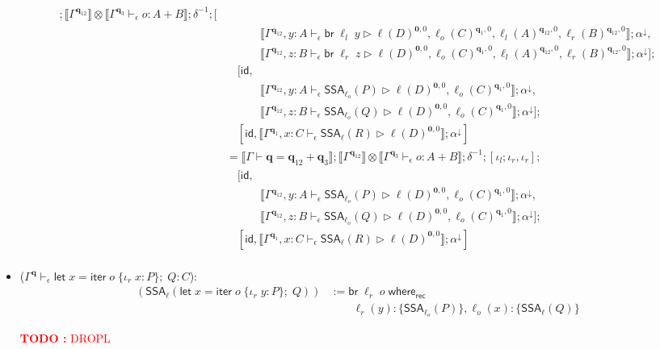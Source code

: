 \documentclass[acmsmall,screen,review]{acmart}
\newcounter{todos}
\newcommand{\TODO}[1]{{
  \stepcounter{todos}
  \begin{center}\large{\textcolor{red}{\textbf{TODO \arabic{todos}:} #1}}\end{center}
}}
\newcommand{\mb}[1]{\ensuremath{\mathbf{#1}}}
\newcommand{\ms}[1]{\ensuremath{\mathsf{#1}}}
\newcommand{\lto}{:}
\newcommand{\linr}[1]{\iota_r\;{#1}}
\newcommand{\letexpr}[3]{\ensuremath{\ms{let}\;#1 = #2;\;#3}}
\newcommand{\brb}[2]{\ms{br}\;#1\;#2}
\newcommand{\cwhere}[2]{#1\;\ms{where}_{\ms{rec}}\;#2}
\newcommand{\wbranch}[3]{#1(#2) \lto \{#3\}}
\newcommand{\liter}[3]{\ms{iter}\;#1\;\{ \linr{#2} \lto #3 \}}
\newcommand{\qsp}[4]{#1 \vdash #2 = #3 + #4}
\newcommand{\hasty}[4]{#1 \vdash_{#2} #3: {#4}}
\newcommand{\haslb}[4]{#1 \vdash_{#2} #3 \rhd #4}
\newcommand{\tossa}[2]{\ms{SSA}_{#1}(#2)}
\newcommand{\dnt}[1]{\llbracket{#1}\rrbracket}
\begin{document}
\begin{itemize}
\begin{align*}
      ; \dnt{\Gamma^{\mb{q}_{12}}} \otimes \dnt{\hasty{\Gamma^{\mb{q}_3}}{\epsilon}{o}{A + B}}
      ; \delta^{-1} ; [
      \\ & \quad \qquad
        \dnt{\haslb{\Gamma^{\mb{q}_{12}}, y : A}{\epsilon}{\brb{\ell_l}{y}}
          {\ell(D)^{\mb{0}, 0}, 
            \ell_o(C)^{\mb{q}_1, 0}, \ell_l(A)^{\mb{q}_{12}, 0}}, \ell_r(B)^{\mb{q}_{12}, 0}} 
          ; \alpha^\downarrow,
      \\ & \quad \qquad
        \dnt{\haslb{\Gamma^{\mb{q}_{12}}, z : B}{\epsilon}{\brb{\ell_r}{z}}
          {\ell(D)^{\mb{0}, 0}, 
            \ell_o(C)^{\mb{q}_1, 0}, \ell_l(A)^{\mb{q}_{12}, 0}}, \ell_r(B)^{\mb{q}_{12}, 0}} 
          ; \alpha^\downarrow
      ]
      ; \\ & \quad
      [
        \ms{id}, \\ & \quad \qquad
        \dnt{
          \haslb{\Gamma^{\mb{q}_{12}}, y : A}{\epsilon}{\tossa{\ell_o}{P}}
                {\ell(D)^{\mb{0}, 0}, \ell_o(C)^{\mb{q}_1, 0}}
        } ; \alpha^\downarrow, \\ & \quad \qquad
        \dnt{
          \haslb{\Gamma^{\mb{q}_{12}}, z : B}{\epsilon}{\tossa{\ell_o}{Q}}
                {\ell(D)^{\mb{0}, 0}, \ell_o(C)^{\mb{q}_1, 0}} 
        } ; \alpha^\downarrow
      ] 
      ; \\ & \quad
      [
        \ms{id}, 
        \dnt{\haslb{\Gamma^{\mb{q}_{1}}, x : C}{\epsilon}{\tossa{\ell}{R}}
              {\ell(D)^{\mb{0}, 0}}} ; \alpha^\downarrow
      ] \\
      & = \dnt{\qsp{\Gamma}{\mb{q}}{\mb{q}_{12}}{\mb{q}_3}} 
        ; \dnt{\Gamma^{\mb{q}_{12}}} \otimes \dnt{\hasty{\Gamma^{\mb{q}_3}}{\epsilon}{o}{A + B}}
        ; \delta^{-1} ; [ \iota_l ; \iota_r , \iota_r ] 
        ; \\ & \quad
        [
          \ms{id}, \\ & \quad \qquad
          \dnt{
            \haslb{\Gamma^{\mb{q}_{12}}, y : A}{\epsilon}{\tossa{\ell_o}{P}}
                  {\ell(D)^{\mb{0}, 0}, \ell_o(C)^{\mb{q}_1, 0}}
          } ; \alpha^\downarrow, \\ & \quad \qquad
          \dnt{
            \haslb{\Gamma^{\mb{q}_{12}}, z : B}{\epsilon}{\tossa{\ell_o}{Q}}
                  {\ell(D)^{\mb{0}, 0}, \ell_o(C)^{\mb{q}_1, 0}} 
          } ; \alpha^\downarrow
        ] 
        ; \\ & \quad
        [
          \ms{id}, 
          \dnt{\haslb{\Gamma^{\mb{q}_{1}}, x : C}{\epsilon}{\tossa{\ell}{R}}
                {\ell(D)^{\mb{0}, 0}}} ; \alpha^\downarrow
        ] \\
  \end{align*}
  \item ($\hasty{\Gamma^{\mb{q}}}{\epsilon}{\letexpr{x}{\liter{o}{x}{P}}{Q}}{C}$): 
  \begin{align*}
    (\tossa{\ell}{\letexpr{x}{\liter{o}{y}{P}}{Q}})
    & := \cwhere{\brb{\ell_r}{o}}{ \\ & \qquad
      \wbranch{\ell_r}{y}{\tossa{\ell_o}{P}},
      \wbranch{\ell_o}{x}{\tossa{\ell}{Q}}
    }
  \end{align*}
  \TODO{DROPL}
\end{itemize}
\end{document}
